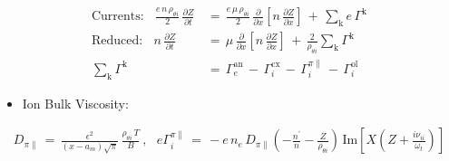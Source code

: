 \documentclass[a4paper,8pt]{article}
\providecommand{\tightlist}{%
  \setlength{\itemsep}{0pt}\setlength{\parskip}{0pt}}
\begin{document}
\begin{align}
    \text{Currents:} ~~~~ \frac{e \, n \, \rho_{\theta i}}{2} \,
        \frac{\partial Z}{\partial t} \,&=\, \frac{e \, \mu \, \rho_{\theta i}}
        {2} \, \frac{\partial}{\partial x} \left[n \, \frac{\partial Z}
        {\partial x}\right] \,+\, \sum_\text{k} e \, \Gamma^\text{k} \\
    \text{Reduced:} ~~~~ n \, \frac{\partial Z}{\partial t} \,&=\, \mu \,
        \frac{\partial}{\partial x} \left[n \, \frac{\partial Z}{\partial x}
        \right] \,+\, \frac{2}{\rho_{\theta i}} \sum_\text{k} \Gamma^\text{k} \\
    \sum_\text{k} \Gamma^\text{k} \,&=\, \Gamma_e^\text{an} \,-\,
        \Gamma_i^\text{cx} \,-\, \Gamma_i^{\pi\parallel} \,-\,
        \Gamma_i^\text{ol}
\end{align}

\normalsize

\begin{itemize}
\tightlist
\item
  Ion Bulk Viscosity: 
\end{itemize}

\small

\begin{align}
    D_{\pi\parallel} \,=\, \frac{\epsilon^2}{(x - a_m) \sqrt{\pi}}\,
        \frac{\rho_{\theta i} \, T}{B}~,~~~
    e \Gamma_i^{\pi\parallel} \,=\, -e\,n_e\,D_{\pi\parallel}
        \left(-\frac{n^\prime}{n} - \frac{Z}{\rho_{\theta i}}\right) \,
        \text{Im}\left[X\left(Z + \frac{i \nu_{ii}}{\omega_t}\right)\right]
\end{align}

\normalsize
\end{document}
